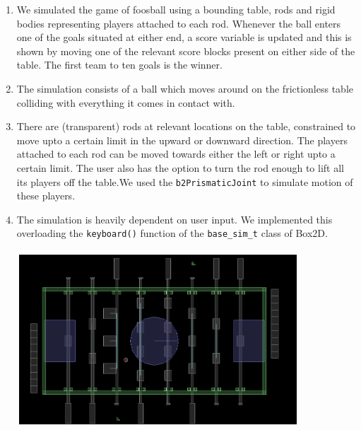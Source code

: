\documentclass{article}
\begin{document}
\begin{enumerate}
\item We simulated the game of foosball using a bounding table, rods and rigid bodies representing players attached to each rod. Whenever the ball enters one of the goals situated at either end, a score variable is updated and this is shown by moving one of the relevant score blocks present on either side of the table. The first team to ten goals is the winner.\\

\item The simulation consists of a ball which moves around on the frictionless table colliding with everything it comes in contact with.\\

\item There are (transparent) rods at relevant locations on the table, constrained to move upto a certain limit in the upward or downward direction. The players attached to each rod can be moved towards either the left or right upto a certain limit. The user also has the option to turn the rod enough to lift all its players off the table.We used the \texttt{b2PrismaticJoint} to simulate motion of these players.\\

\item The simulation is heavily dependent on user input. We implemented this overloading the \texttt{keyboard()} function of the \texttt{base\_sim\_t} class of Box2D.\\ \\

\includegraphics[width=300pt,height=180pt]{Foosball_2}

\end{enumerate}
\end{document}
